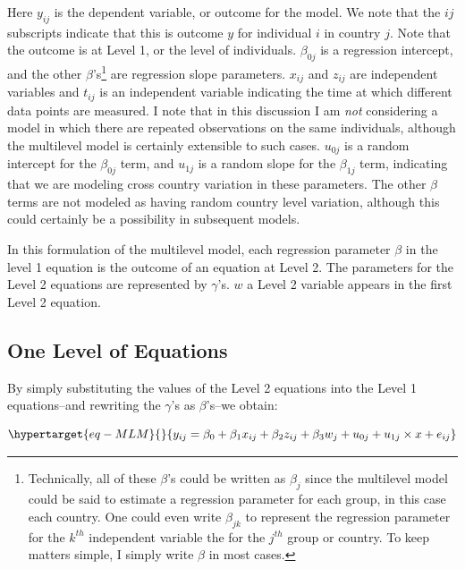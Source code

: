 \documentclass[
  letterpaper,
  DIV=11,
  numbers=noendperiod]{scrreprt}
\begin{document}
Here \(y_{ij}\) is the dependent variable, or outcome for the model. We
note that the \(ij\) subscripts indicate that this is outcome \(y\) for
individual \(i\) in country \(j\). Note that the outcome is at Level 1,
or the level of individuals. \(\beta_{0j}\) is a regression intercept,
and the other \(\beta\)'s\footnote{Technically, all of these \(\beta\)'s
  could be written as \(\beta_j\) since the multilevel model could be
  said to estimate a regression parameter for each group, in this case
  each country. One could even write \(\beta_{jk}\) to represent the
  regression parameter for the \(k^{th}\) independent variable the for
  the \(j^{th}\) group or country. To keep matters simple, I simply
  write \(\beta\) in most cases.} are regression slope parameters.
\(x_{ij}\) and \(z_{ij}\) are independent variables and \(t_{ij}\) is an
independent variable indicating the time at which different data points
are measured. I note that in this discussion I am \emph{not} considering
a model in which there are repeated observations on the same
individuals, although the multilevel model is certainly extensible to
such cases. \(u_{0j}\) is a random intercept for the \(\beta_{0j}\)
term, and \(u_{1j}\) is a random slope for the \(\beta_{1j}\) term,
indicating that we are modeling cross country variation in these
parameters. The other \(\beta\) terms are not modeled as having random
country level variation, although this could certainly be a possibility
in subsequent models.

In this formulation of the multilevel model, each regression parameter
\(\beta\) in the level 1 equation is the outcome of an equation at Level
2. The parameters for the Level 2 equations are represented by
\(\gamma\)'s. \(w\) a Level 2 variable appears in the first Level 2
equation.

\hypertarget{one-level-of-equations}{%
\subsection{One Level of Equations}\label{one-level-of-equations}}

By simply substituting the values of the Level 2 equations into the
Level 1 equations--and rewriting the \(\gamma\)'s as \(\beta\)'s--we
obtain:

\begin{equation}\protect\hypertarget{eq-MLM}{}{y_{ij} = \beta_0 + \beta_1 x_{ij} + \beta_2 z_{ij} + \beta_3 w_{j} + u_{0j} + u_{1j} \times x + e_{ij}}\label{eq-MLM}\end{equation}
\end{document}
